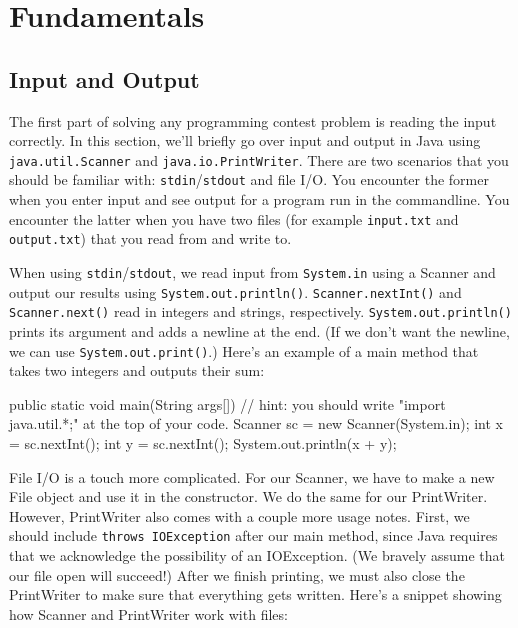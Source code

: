 \chapter{Fundamentals}

\section{Input and Output}

The first part of solving any programming contest problem is reading the input correctly. In this section, we'll briefly go over input and output in Java using \texttt{java.util.Scanner} and \texttt{java.io.PrintWriter}. There are two scenarios that you should be familiar with: \texttt{stdin}/\texttt{stdout} and file I/O. You encounter the former when you enter input and see output for a program run in the commandline. You encounter the latter when you have two files (for example \texttt{input.txt} and \texttt{output.txt}) that you read from and write to.

When using \texttt{stdin}/\texttt{stdout}, we read input from \texttt{System.in} using a Scanner and output our results using \texttt{System.out.println()}. \texttt{Scanner.nextInt()} and \texttt{Scanner.next()} read in integers and strings, respectively. \texttt{System.out.println()} prints its argument and adds a newline at the end. (If we don't want the newline, we can use \texttt{System.out.print()}.) Here's an example of a main method that takes two integers and outputs their sum:

\begin{mylstlisting}
public static void main(String args[]){
  // hint: you should write "import java.util.*;" at the top of your code.
  Scanner sc = new Scanner(System.in);
  int x = sc.nextInt();
  int y = sc.nextInt();
  System.out.println(x + y);
}
\end{mylstlisting}

File I/O is a touch more complicated. For our Scanner, we have to make a new File object and use it in the constructor. We do the same for our PrintWriter. However, PrintWriter also comes with a couple more usage notes. First, we should include \texttt{throws IOException} after our main method, since Java requires that we acknowledge the possibility of an IOException. (We bravely assume that our file open will succeed!) After we finish printing, we must also close the PrintWriter to make sure that everything gets written. Here's a snippet showing how Scanner and PrintWriter work with files: 

